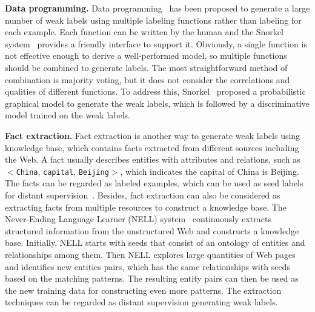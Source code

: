 \textbf{Data programming.}
Data programming~\cite{DBLP:conf/nips/RatnerSWSR16} has been proposed to generate a large number of weak labels using multiple  labeling functions rather than labeling for each example. Each function can be written by the human and the Snorkel system~\cite{DBLP:journals/vldb/RatnerBEFWR20} provides a friendly interface to support it. Obviously, a single function is not  effective enough to derive a well-performed model, so multiple functions should be combined to generate labels. The most straightforward method of combination is majority voting, but it does not consider the correlations and qualities of different functions. To address this, Snorkel~\cite{DBLP:journals/vldb/RatnerBEFWR20} proposed a probabilistic  graphical model to generate the weak labels, which is followed by a discriminative model trained on the weak labels.


\textbf{Fact extraction.}
Fact extraction is another way to generate weak labels using knowledge base, which contains facts  extracted from different sources including the Web. A fact usually describes entities with attributes and relations, such as $<$\texttt{China}, \texttt{capital}, \texttt{Beijing}$>$, which indicates the capital of China is Beijing. The facts can be regarded as labeled examples, which
can be used as seed labels for distant supervision~\cite{DBLP:conf/acl/MintzBSJ09}.  Besides, fact extraction can also be considered as extracting facts from multiple resources to construct a knowledge base.
The Never-Ending Language Learner (NELL) system~\cite{DBLP:conf/aaai/MitchellCHTBCMG15} continuously extracts structured information from the unstructured Web and constructs a knowledge base. Initially, NELL starts with seeds that consist of an ontology of  entities   and relationships among them. Then NELL explores large quantities of Web pages and identifies new entities pairs, which has the same relationships with seeds based on the  matching patterns. The resulting entity pairs can then be used as the new training data for constructing even more patterns. The extraction techniques can be regarded as distant supervision generating weak labels.





\iffalse
\begin{figure}[h!]
	\centering
	\texttt{[image: figs/framework.pdf]}
	\caption{System Overview}
	\label{fig:framwork}
\end{figure}
\fi





